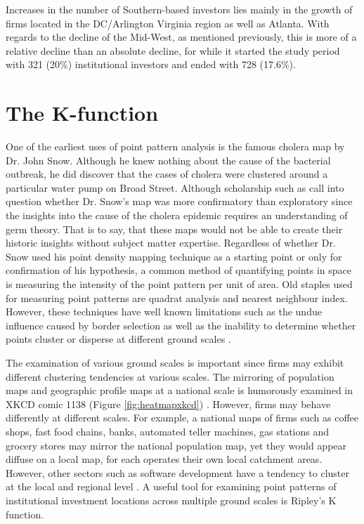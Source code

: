Increases in the number of Southern-based investors lies mainly in the growth of firms located in the DC/Arlington Virginia region as well as Atlanta. With regards to the decline of the Mid-West, as mentioned previously, this is more of a relative decline than an absolute decline, for while it started the study period with 321 (20\%) institutional investors and ended with 728 (17.6\%).







\section{The K-function} 
\label{kfunction}
One of the earliest uses of point pattern analysis is the famous cholera map by Dr. John Snow.  Although he knew nothing about the cause of the bacterial outbreak, he did discover that the cases of cholera were clustered around a particular water pump on Broad Street.  Although scholarship such as \cite{brody2000map} call into question whether Dr. Snow's map was more confirmatory than exploratory since the insights into the cause of the cholera epidemic requires an understanding of germ theory.  That is to say, that these maps would not be able to create their historic insights without subject matter expertise.  Regardless of whether Dr. Snow used his point density mapping technique as a starting point or only for confirmation of his hypothesis,  a common method of quantifying points in space is measuring the intensity of the point pattern per unit of area.  Old staples used for measuring point patterns are quadrat analysis and nearest neighbour index.  However, these techniques have well known limitations such as the undue influence caused by border selection as well as the inability to determine whether points cluster or disperse at different ground scales \citep{spatstatBook}.

The examination of various ground scales is important since firms may exhibit different clustering tendencies at various scales.  The mirroring of population maps and geographic profile maps at a national scale is humorously examined in XKCD comic 1138 (Figure \ref{fig:heatmapxkcd}) \citep{XKCD1138}.  However, firms may behave differently at different scales.  For example, a national maps of firms such as coffee shops, fast food chains, banks, automated teller machines, gas stations and grocery stores may mirror the national population map, yet they would appear diffuse on a local map, for each operates their own local catchment areas.  However, other sectors such as software development have a tendency to cluster at the local and regional level \citep{Meyer2006}.  A useful tool for examining point patterns of institutional investment locations across multiple ground scales is Ripley's K function.  

